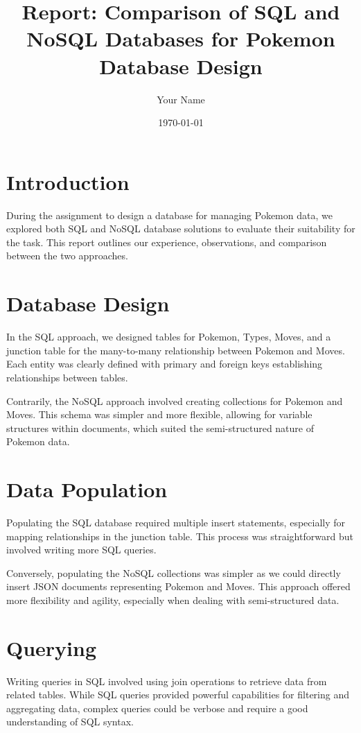 \documentclass{article}
\title{Report: Comparison of SQL and NoSQL Databases for Pokemon Database Design}
\author{Your Name}
\date{\today}
\begin{document}
\maketitle

\section{Introduction}

During the assignment to design a database for managing Pokemon data, we explored both SQL and NoSQL database solutions to evaluate their suitability for the task. This report outlines our experience, observations, and comparison between the two approaches.

\section{Database Design}

In the SQL approach, we designed tables for Pokemon, Types, Moves, and a junction table for the many-to-many relationship between Pokemon and Moves. Each entity was clearly defined with primary and foreign keys establishing relationships between tables.

Contrarily, the NoSQL approach involved creating collections for Pokemon and Moves. This schema was simpler and more flexible, allowing for variable structures within documents, which suited the semi-structured nature of Pokemon data.

\section{Data Population}

Populating the SQL database required multiple insert statements, especially for mapping relationships in the junction table. This process was straightforward but involved writing more SQL queries.

Conversely, populating the NoSQL collections was simpler as we could directly insert JSON documents representing Pokemon and Moves. This approach offered more flexibility and agility, especially when dealing with semi-structured data.

\section{Querying}

Writing queries in SQL involved using join operations to retrieve data from related tables. While SQL queries provided powerful capabilities for filtering and aggregating data, complex queries could be verbose and require a good understanding of SQL syntax.
\end{document}
